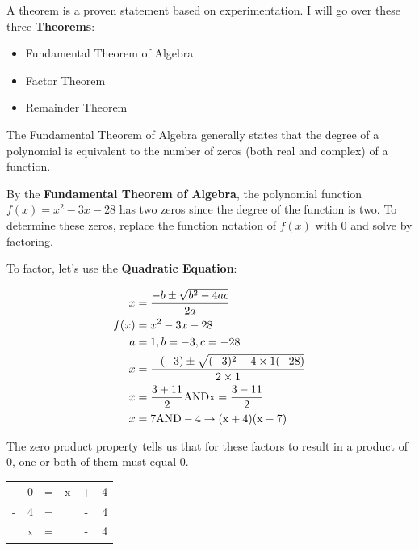 
\begin{definition}[Theorems]
    A theorem is a proven statement based on experimentation. I will go over
    these three \textbf{Theorems}:
    
    \begin{itemize}
        \item Fundamental Theorem of Algebra
        \item Factor Theorem
        \item Remainder Theorem
    \end{itemize}
\end{definition}

\begin{theorem}
    The Fundamental Theorem of Algebra generally states that the degree of a polynomial is equivalent to the number of zeros (both real and complex) of a function.
    
    By the \textbf{Fundamental Theorem of Algebra}, the polynomial function $f(x) = x^2 - 3x - 28$ has two zeros since the degree of the function is two. To determine these zeros, replace the function notation of $f(x)$ with $0$ and solve by factoring.
    
    To factor, let's use the \textbf{Quadratic Equation}:
    
    \begin{align}
        x    &= \frac{-b \pm \sqrt{b^2 - 4ac}}{2a} \\
        f(x) &= x^2 - 3x - 28 \\
        a    &= 1, b = -3, c = -28 \\
        x    &= \frac{-(-3) \pm \sqrt{(-3)^2 - 4 \times 1(-28)}}{2 \times 1} \\
        x    &= \frac{3 + 11}{2} \rm{ AND } x = \frac{3 - 11}{2} \\
        x    &= 7 \rm{ AND } -4 \rightarrow (x + 4)(x - 7)
    \end{align}
    
    The zero product property tells us that for these factors to result in a product of $0$, one or both of them must equal $0$.
    
    \begin{minipage}[c]{0.5\textwidth}
        \centering
        \begin{tabular}{cccccc}
            & 0 & = & x & + & 4 \\
            - & 4 & = &   & - & 4 \\
            \hline
            & x & = & & - & 4 \\
        \end{tabular}
    \end{minipage}
    

\end{theorem}
